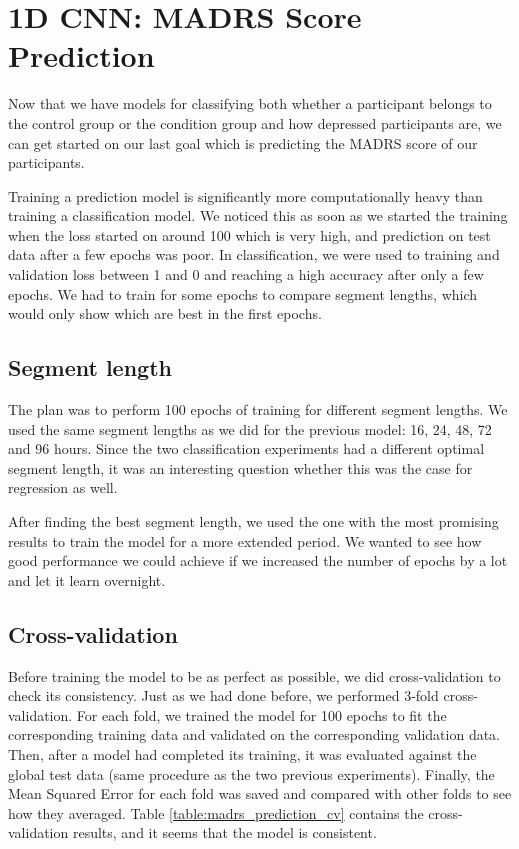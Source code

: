 \section{1D CNN: MADRS Score Prediction}
Now that we have models for classifying both whether a participant belongs to the control group or the condition group and how depressed participants are, we can get started on our last goal which is predicting the MADRS score of our participants. 

Training a prediction model is significantly more computationally heavy than training a classification model. We noticed this as soon as we started the training when the loss started on around 100 which is very high, and prediction on test data after a few epochs was poor. In classification, we were used to training and validation loss between 1 and 0 and reaching a high accuracy after only a few epochs. We had to train for some epochs to compare segment lengths, which would only show which are best in the first epochs.

\subsection{Segment length}
The plan was to perform 100 epochs of training for different segment lengths. We used the same segment lengths as we did for the previous model: 16, 24, 48, 72 and 96 hours. Since the two classification experiments had a different optimal segment length, it was an interesting question whether this was the case for regression as well. 

After finding the best segment length, we used the one with the most promising results to train the model for a more extended period. We wanted to see how good performance we could achieve if we increased the number of epochs by a lot and let it learn overnight. 

\subsection{Cross-validation}
Before training the model to be as perfect as possible, we did cross-validation to check its consistency. Just as we had done before, we performed 3-fold cross-validation. For each fold, we trained the model for 100 epochs to fit the corresponding training data and validated on the corresponding validation data. Then, after a model had completed its training, it was evaluated against the global test data (same procedure as the two previous experiments). Finally, the Mean Squared Error for each fold was saved and compared with other folds to see how they averaged. Table \ref{table:madrs_prediction_cv} contains the cross-validation results, and it seems that the model is consistent.


